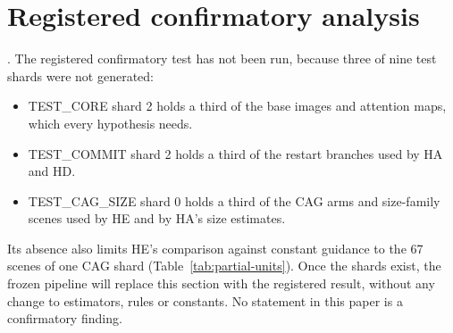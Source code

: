 \section{Registered confirmatory analysis}\label{sec:resCONF}
. The registered confirmatory test has not been run, because three of nine test shards were not generated:
\begin{itemize}
\item TEST\_CORE shard 2 holds a third of the base images and attention maps, which every hypothesis needs.
\item TEST\_COMMIT shard 2 holds a third of the restart branches used by HA and HD.
\item TEST\_CAG\_SIZE shard 0 holds a third of the CAG arms and size-family scenes used by HE and by HA's size estimates.
\end{itemize}
Its absence also limits HE's comparison against constant guidance to the 67 scenes of one CAG shard (Table~\ref{tab:partial-units}). Once the shards exist, the frozen pipeline will replace this section with the registered result, without any change to estimators, rules or constants. No statement in this paper is a confirmatory finding.
